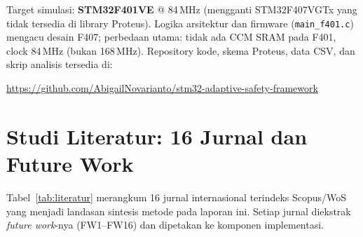 \documentclass[12pt,a4paper]{article}
\begin{document}
Target simulasi: \textbf{STM32F401VE} @ 84\,MHz (mengganti STM32F407VGTx yang tidak tersedia di library Proteus). Logika arsitektur dan firmware (\texttt{main\_f401.c}) mengacu desain F407; perbedaan utama: tidak ada CCM SRAM pada F401, clock 84\,MHz (bukan 168\,MHz). Repository kode, skema Proteus, data CSV, dan skrip analisis tersedia di:

\begin{center}
\url{https://github.com/AbigailNovarianto/stm32-adaptive-safety-framework}
\end{center}

\section{Studi Literatur: 16 Jurnal dan Future Work}

Tabel~\ref{tab:literatur} merangkum 16 jurnal internasional terindeks Scopus/WoS yang menjadi landasan sintesis metode pada laporan ini. Setiap jurnal diekstrak \textit{future work}-nya (FW1--FW16) dan dipetakan ke komponen implementasi.
\end{document}
